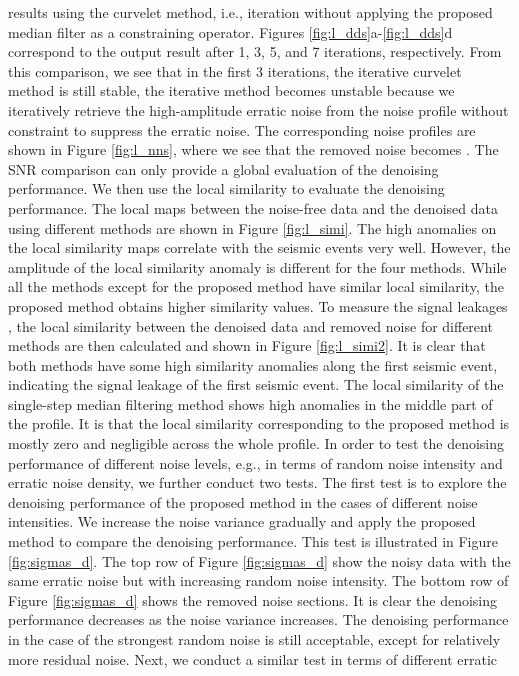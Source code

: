  results using the curvelet method, i.e., iteration without applying the proposed median filter as a constraining operator. Figures \ref{fig:l_dds}a-\ref{fig:l_dds}d correspond to the output result after 1, 3, 5, and 7 iterations, respectively. From this comparison, we see that in the first 3 iterations, the iterative curvelet method is still stable,  the iterative method becomes unstable because we iteratively retrieve the high-amplitude erratic noise from the noise profile without constraint to suppress the erratic noise. The corresponding noise profiles are shown in Figure \ref{fig:l_nns}, where we see that the removed noise becomes . The SNR comparison can only provide a global evaluation of the denoising performance. We then use the local similarity to evaluate the denoising performance. The local  maps between the noise-free data and the denoised data using different methods are shown in Figure \ref{fig:l_simi}. The high anomalies on the local similarity maps correlate with the seismic events very well. However, the amplitude of the local similarity anomaly is different for the four methods. While all the methods except for the proposed method have similar local similarity, the proposed method obtains higher similarity values. To measure the signal leakages \cite[]{yangkang2015ortho}, the local similarity between the denoised data and removed noise for different methods are then calculated and shown in Figure \ref{fig:l_simi2}. It is clear that both  methods have some high similarity anomalies along the first seismic event, indicating the signal leakage of the first seismic event. The local similarity of the single-step median filtering method shows high anomalies in the middle part of the profile. It is  that the local similarity corresponding to the proposed method is mostly zero and negligible across the whole profile. In order to test the denoising performance of different noise levels, e.g., in terms of random noise intensity and erratic noise density, we further conduct two tests. The first test is to explore the denoising performance of the proposed method in the cases of different noise intensities. We increase the noise variance gradually and apply the proposed method to compare the denoising performance. This test is illustrated in Figure \ref{fig:sigmas_d}. The top row of Figure \ref{fig:sigmas_d} show the noisy data with the same erratic noise but with increasing random noise intensity. The bottom row of Figure \ref{fig:sigmas_d}  shows the  removed noise sections. It is clear the denoising performance decreases as the noise variance increases. The denoising performance in the case of the strongest random noise is still acceptable, except for relatively more residual noise. Next, we conduct a similar test in terms of different erratic 
